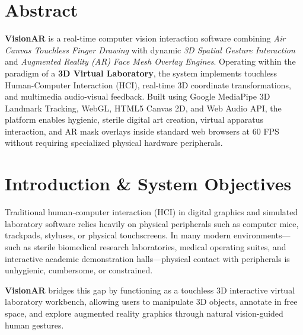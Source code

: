 \documentclass[11pt,a4paper]{article}
\begin{document}
\newpage

\section*{Abstract}
\textbf{VisionAR} is a real-time computer vision interaction software combining \textit{Air Canvas Touchless Finger Drawing} with dynamic \textit{3D Spatial Gesture Interaction} and \textit{Augmented Reality (AR) Face Mesh Overlay Engines}. Operating within the paradigm of a \textbf{3D Virtual Laboratory}, the system implements touchless Human-Computer Interaction (HCI), real-time 3D coordinate transformations, and multimedia audio-visual feedback. Built using Google MediaPipe 3D Landmark Tracking, WebGL, HTML5 Canvas 2D, and Web Audio API, the platform enables hygienic, sterile digital art creation, virtual apparatus interaction, and AR mask overlays inside standard web browsers at 60 FPS without requiring specialized physical hardware peripherals.

\tableofcontents
\newpage

\section{Introduction \& System Objectives}
Traditional human-computer interaction (HCI) in digital graphics and simulated laboratory software relies heavily on physical peripherals such as computer mice, trackpads, styluses, or physical touchscreens. In many modern environments---such as sterile biomedical research laboratories, medical operating suites, and interactive academic demonstration halls---physical contact with peripherals is unhygienic, cumbersome, or constrained.

\textbf{VisionAR} bridges this gap by functioning as a touchless 3D interactive virtual laboratory workbench, allowing users to manipulate 3D objects, annotate in free space, and explore augmented reality graphics through natural vision-guided human gestures.
\end{document}
